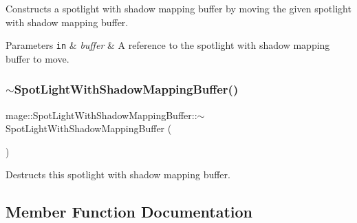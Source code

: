 Constructs a spotlight with shadow mapping buffer by moving the given spotlight with shadow mapping buffer.


\begin{DoxyParams}[1]{Parameters}
\mbox{\tt in}  & {\em buffer} & A reference to the spotlight with shadow mapping buffer to move. \\
\hline
\end{DoxyParams}
\hypertarget{structmage_1_1_spot_light_with_shadow_mapping_buffer_ae96fbec68878382084dce0147da2eb72}{}\label{structmage_1_1_spot_light_with_shadow_mapping_buffer_ae96fbec68878382084dce0147da2eb72} 
\subsubsection{\texorpdfstring{$\sim$\+Spot\+Light\+With\+Shadow\+Mapping\+Buffer()}{~SpotLightWithShadowMappingBuffer()}}
{\footnotesize\ttfamily mage\+::\+Spot\+Light\+With\+Shadow\+Mapping\+Buffer\+::$\sim$\+Spot\+Light\+With\+Shadow\+Mapping\+Buffer (\begin{DoxyParamCaption}{ }\end{DoxyParamCaption})\hspace{0.3cm}{\ttfamily [default]}}

Destructs this spotlight with shadow mapping buffer. 

\subsection{Member Function Documentation}
\hypertarget{structmage_1_1_spot_light_with_shadow_mapping_buffer_ad22e5a39ca0f4f313de923876c02b2ac}{}\label{structmage_1_1_spot_light_with_shadow_mapping_buffer_ad22e5a39ca0f4f313de923876c02b2ac} 
